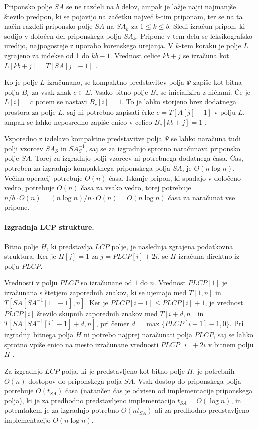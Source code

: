 Priponsko polje $SA$ se ne razdeli na $b$ delov, ampak je lažje najti najmanjše število predpon, ki se pojavijo na začetku največ $b$-tim priponam, ter se na ta način razdeli priponsko polje $SA$ na $SA_k$ za $1\le k\le b$. Sledi izračun pripon, ki sodijo v določen del priponskega polja $SA_k$. Pripone v tem delu se leksikografsko uredijo, najpogosteje z uporabo korenskega urejanja. V $k$-tem koraku je polje $L$ zgrajeno za indekse od 1 do $kb-1$. Vrednost celice $kb+j$ se izračuna kot $L[kb+j]=T[SA[j]-1]$ \cite{Navarro2016}.

Ko je polje $L$ izračunano, se kompaktno predstavitev polja $\Psi$ zapiše kot bitna polja $B_c$ za vsak znak $c\in \Sigma$. Vsako bitno polje $B_c$ se inicializira z ničlami. Če je $L[i]=c$ potem se nastavi $B_c[i]=1$. To je lahko storjeno brez dodatnega prostora za polje $L$, saj ni potrebno zapisati črke $c=T[A[j]-1]$ v polju $L$, ampak se lahko neposredno zapiše enico v celico $B_c[kb+j]=1$ \cite{Navarro2016}.

Vzporedno z izdelavo kompaktne predstavitve polja $\Psi$ se lahko naračuna tudi polji vzorcev $SA_S$ in $SA_S^{-1}$, saj se za izgradnjo sprotno naračunava priponsko polje $SA$. Torej za izgradnjo polji vzorcev ni potrebnega dodatnega časa. Čas, potreben za izgradnjo kompaktnega priponskega polja $SA$, je $O(n\log{n})$. Večina operacij potrebuje $O(n)$ časa. Iskanje pripon, ki spadajo v določeno vedro, potrebuje $O(n)$ časa za vsako vedro, torej potrebuje $n/b\cdot O(n)=(n\log{n})/n\cdot O(n)=O(n\log{n})$ časa za naračunat vse pripone. 

\paragraph{Izgradnja LCP strukture.}
Bitno polje $H$, ki predstavlja $LCP$ polje, je naslednja zgrajena podatkovna struktura. Ker je $H[j]=1$ za $j=PLCP[i]+2i$, se $H$ izračuna direktno iz polja $PLCP$.

Vrednosti v polju $PLCP$ so izračunane od $1$ do $n$. Vrednost $PLCP[1]$ je izračunana s štetjem zaporednih znakov, ki se ujemajo med $T[1,n]$ in $T[SA[SA^{-1}[1]-1],n]$. Ker je $PLCP[i-1]\le PLCP[i]+1$, je vrednost $PLCP[i]$ število skupnih zaporednih znakov med $T[i+d,n]$ in $T[SA[SA^{-1}[i]-1]+d,n]$, pri čemer $d=\max\{PLCP[i-1]-1,0\}$.
Pri izgradnji bitnega polja $H$ ni potrebo najprej naračunati polja $PLCP$, saj se lahko sprotno vpiše enico na mesto izračunane vrednosti $PLCP[i]+2i$ v bitnem polju $H$ \cite{Navarro2016}.

Za izgradnjo $LCP$ polja, ki je predstavljeno kot bitno polje $H$, je potrebnih $O(n)$ dostopov do priponskega polja $SA$. Vsak dostop do priponskega polja potrebuje $O(t_{SA})$ časa (natančen čas je odvisen od implementacije priponskega polja), ki je za predhodno predstavljeno implementacijo $t_{SA}= O(\log{n})$, in potemtakem je za izgradnjo potrebno $O(nt_{SA})$ ali za predhodno predstavljeno implementacijo $O(n\log{n})$.


